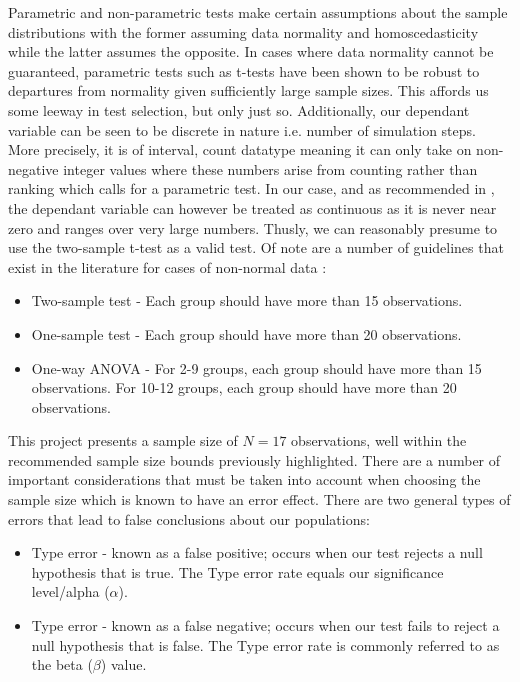 \documentclass{report}
\newcommand{\rom}[1]{\uppercase\expandafter{\romannumeral #1\relax}}
\begin{document}
Parametric and non-parametric tests make certain assumptions about the sample distributions with the former assuming data normality and homoscedasticity while the latter assumes the opposite. In cases where data normality cannot be guaranteed, parametric tests such as t-tests have been shown to be robust to departures from normality given sufficiently large sample sizes. This affords us some leeway in test selection, but only just so. Additionally, our dependant variable can be seen to be discrete in nature i.e. number of simulation steps. More precisely, it is of interval, count datatype meaning it can only take on non-negative integer values where these numbers arise from counting rather than ranking which calls for a parametric test. In our case, and as recommended in \cite{CountCont}, the dependant variable can however be treated as continuous as it is never near zero and ranges over very large numbers. Thusly, we can reasonably presume to use the two-sample t-test as a valid test. Of note are a number of guidelines that exist in the literature for cases of non-normal data \cite{MTGuides}:
\begin{itemize}
	\item Two-sample test - Each group should have more than 15 observations.
	\item One-sample test - Each group should have more than 20 observations.
	\item One-way ANOVA - For 2-9 groups, each group should have more than 15 observations. For 10-12 groups, each group should have more than 20 observations.
\end{itemize}

This project presents a sample size of $N=17$ observations, well within the recommended sample size bounds previously highlighted. There are a number of important considerations that must be taken into account when choosing the sample size which is known to have an error effect. There are two general types of errors that lead to false conclusions about our populations:
\begin{itemize}
	\item Type \rom{1} error - known as a false positive; occurs when our test rejects a null hypothesis that is true. The Type \rom{1} error rate equals our significance level/alpha ($\alpha$).
	\item Type \rom{2} error - known as a false negative; occurs when our test fails to reject a null hypothesis that is false. The Type \rom{2} error rate is commonly referred to as the beta ($\beta$) value.
\end{itemize}
\end{document}
